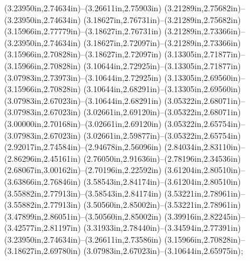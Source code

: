 (3.23950in,2.74634in)--(3.26611in,2.75903in) (3.21289in,2.75682in)--(3.23950in,2.74634in) (3.18627in,2.76731in)--(3.21289in,2.75682in) (3.15966in,2.77779in)--(3.18627in,2.76731in) (3.21289in,2.73366in)--(3.23950in,2.74634in) (3.18627in,2.72097in)--(3.21289in,2.73366in) (3.15966in,2.70828in)--(3.18627in,2.72097in) (3.13305in,2.71877in)--(3.15966in,2.70828in) (3.10644in,2.72925in)--(3.13305in,2.71877in) (3.07983in,2.73973in)--(3.10644in,2.72925in) (3.13305in,2.69560in)--(3.15966in,2.70828in) (3.10644in,2.68291in)--(3.13305in,2.69560in) (3.07983in,2.67023in)--(3.10644in,2.68291in) (3.05322in,2.68071in)--(3.07983in,2.67023in) (3.02661in,2.69120in)--(3.05322in,2.68071in) (3.00000in,2.70168in)--(3.02661in,2.69120in) (3.05322in,2.65754in)--(3.07983in,2.67023in) (3.02661in,2.59877in)--(3.05322in,2.65754in) (2.92017in,2.74584in)--(2.94678in,2.56096in) (2.84034in,2.83110in)--(2.86296in,2.45161in) (2.76050in,2.91636in)--(2.78196in,2.34536in) (2.68067in,3.00162in)--(2.70196in,2.22592in) (3.61204in,2.80510in)--(3.63866in,2.76846in) (3.58543in,2.84174in)--(3.61204in,2.80510in) (3.55882in,2.77913in)--(3.58543in,2.84174in) (3.53221in,2.78961in)--(3.55882in,2.77913in) (3.50560in,2.85002in)--(3.53221in,2.78961in) (3.47899in,2.86051in)--(3.50560in,2.85002in) (3.39916in,2.82245in)--(3.42577in,2.81197in) (3.31933in,2.78440in)--(3.34594in,2.77391in) (3.23950in,2.74634in)--(3.26611in,2.73586in) (3.15966in,2.70828in)--(3.18627in,2.69780in) (3.07983in,2.67023in)--(3.10644in,2.65975in);
